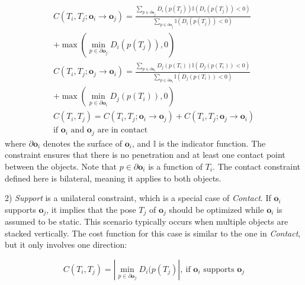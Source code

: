 \begin{equation}
\label{eq:contact-constraint}
\begin{split}
    C(T_i, T_j; \bm{o}_i \to \bm{o}_j) = 
    \frac{\sum_{p \in \partial \bm{o}_j} D_i(p(T_j)) \mathbb{I}(D_i(p(T_j))<0)}{\sum_{p \in \partial \bm{o}_j} \mathbb{I}(D_i(p(T_j))<0)} 
    \\
    + \max(\min_{p \in \partial \bm{o}_j}D_i(p(T_j)),0)
    \\
    C(T_i, T_j; \bm{o}_j \to \bm{o}_i) =\frac{\sum_{p \in \partial \bm{o}_i} D_j(p(T_i)) \mathbb{I}(D_j(p(T_i))<0)}{\sum_{p \in \partial \bm{o}_i} \mathbb{I}(D_j(p(T_i))<0)}
    \\
    + \max(\min_{p \in \partial \bm{o}_i}D_j(p(T_i)),0)
    \\
    C(T_i,T_j) = C(T_i, T_j; \bm{o}_i \to \bm{o}_j) + C(T_i, T_j; \bm{o}_j \to \bm{o}_i)
    \\
    \text{if } \bm{o}_i \text{ and } \bm{o}_j \text{ are in contact}
\end{split}
\end{equation}
where $\partial \bm{o}_i$ denotes the surface of $\bm{o}_i$, and $\mathbb{I}$ is the indicator function. The constraint ensures that there is no penetration and at least one contact point between the objects. Note that $p \in \partial \bm{o}_i$ is a function of $T_i$. The contact constraint defined here is bilateral, meaning it applies to both objects.

2) \emph{Support} is a unilateral constraint, which is a special case of \emph{Contact}. If $\bm{o}_i$ supports $\bm{o}_j$, it implies that the pose $T_j$ of $\bm{o}_j$ should be optimized while $\bm{o}_i$ is assumed to be static. This scenario typically occurs when multiple objects are stacked vertically. The cost function for this case is similar to the one in \emph{Contact}, but it only involves one direction:

\begin{equation}
\label{eq:support-constraint}
    C(T_i,T_j) = |\min_{p \in \partial \bm{o}_j} D_i(p(T_j)|,\ \text{if } \bm{o}_i \text{ supports } \bm{o}_j
\end{equation}

